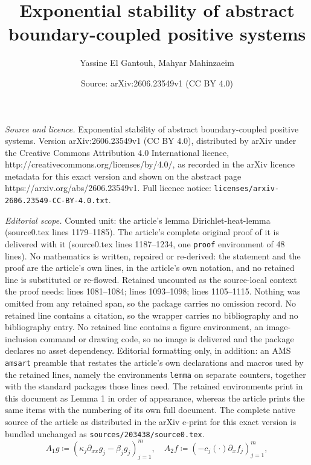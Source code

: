\documentclass[10pt,a4paper]{amsart}
\title{Exponential stability of abstract boundary-coupled positive systems}
\author{Yassine El Gantouh, Mahyar Mahinzaeim}
\date{Source: arXiv:2606.23549v1 (CC BY 4.0)}
\begin{document}
\maketitle

\noindent\emph{Source and licence.} Exponential stability of abstract boundary-coupled positive systems. Version arXiv:2606.23549v1 (CC BY 4.0), distributed by arXiv under the Creative Commons Attribution 4.0 International licence, http://creativecommons.org/licenses/by/4.0/, as recorded in the arXiv licence metadata for this exact version and shown on the abstract page https://arxiv.org/abs/2606.23549v1. Full licence notice: \texttt{licenses/arxiv-2606.23549-CC-BY-4.0.txt}.\par\smallskip

\noindent\textit{Editorial scope.} Counted unit: the article's lemma Dirichlet-heat-lemma (source0.tex lines 1179--1185). The article's complete original proof of it is delivered with it (source0.tex lines 1187--1234, one \texttt{proof} environment of 48 lines). No mathematics is written, repaired or re-derived: the statement and the proof are the article's own lines, in the article's own notation, and no retained line is substituted or re-flowed.  Retained uncounted as the source-local context the proof needs: lines 1081--1084; lines 1093--1098; lines 1105--1115.  Nothing was omitted from any retained span, so the package carries no omission record.  No retained line contains a citation, so the wrapper carries no bibliography and no bibliography entry.  No retained line contains a figure environment, an image-inclusion command or drawing code, so no image is delivered and the package declares no asset dependency.  Editorial formatting only, in addition: an AMS \texttt{amsart} preamble that restates the article's own declarations and macros used by the retained lines, namely the environments \texttt{lemma} on separate counters, together with the standard packages those lines need.  The retained environments print in this document as Lemma 1 in order of appearance, whereas the article prints the same items with the numbering of its own full document.  The complete native source of the article as distributed in the arXiv e-print for this exact version is bundled unchanged as \texttt{sources/203438/source0.tex}.
\begin{equation}\label{system.operators}
A_1g\coloneqq (\kappa_j\partial_{xx}g_j-\beta_jg_j)_{j=1}^m,\quad 
A_2f\coloneqq (-c_j(\cdot)\partial_{x}f_j)_{j=1}^m,
\end{equation}
\end{document}
